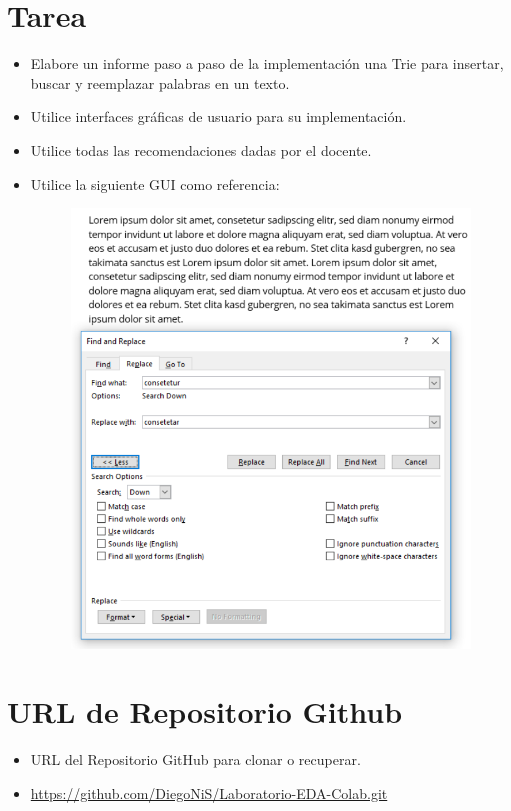 \section{Tarea}
\begin{itemize}
    \item Elabore un informe paso a paso de la implementación una Trie para insertar, buscar y reemplazar palabras en un texto.
    \item Utilice interfaces gráficas de usuario para su implementación.
    \item Utilice todas las recomendaciones dadas por el docente.
    \item Utilice la siguiente GUI como referencia:
    \begin{figure}[h!]
        \begin{center}
            \includegraphics[scale=0.28]{img/GUI.png}
        \end{center}
    \end{figure}
\end{itemize}
\section{URL de Repositorio Github}
\begin{itemize}
    \item URL del Repositorio GitHub para clonar o recuperar.
    \item \url{https://github.com/DiegoNiS/Laboratorio-EDA-Colab.git}
\end{itemize}


